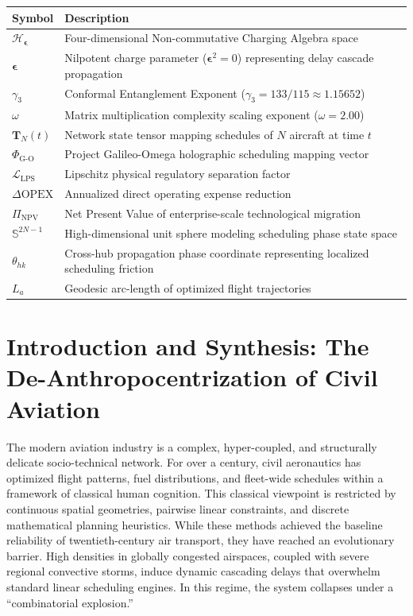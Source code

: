 \documentclass[11pt,a4paper]{book}
\begin{document}
\begin{tabular}{ll}
    \toprule
    \textbf{Symbol} & \textbf{Description} \\
    \midrule
    $\mathcal{H}_{\bm{\epsilon}}$ & Four-dimensional Non-commutative Charging Algebra space \\
    $\bm{\epsilon}$ & Nilpotent charge parameter ($\bm{\epsilon}^2 = 0$) representing delay cascade propagation \\
    $\gamma_3$ & Conformal Entanglement Exponent ($\gamma_3 = 133/115 \approx 1.15652$) \\
    $\omega$ & Matrix multiplication complexity scaling exponent ($\omega = 2.00$) \\
    $\mathbf{T}_N(t)$ & Network state tensor mapping schedules of $N$ aircraft at time $t$ \\
    $\Phi_{\text{G-O}}$ & Project Galileo-Omega holographic scheduling mapping vector \\
    $\mathcal{L}_{\text{LPS}}$ & Lipschitz physical regulatory separation factor \\
    $\Delta \text{OPEX}$ & Annualized direct operating expense reduction \\
    $\Pi_{\text{NPV}}$ & Net Present Value of enterprise-scale technological migration \\
    $\mathbb{S}^{2N-1}$ & High-dimensional unit sphere modeling scheduling phase state space \\
    $\theta_{hk}$ & Cross-hub propagation phase coordinate representing localized scheduling friction \\
    $L_a$ & Geodesic arc-length of optimized flight trajectories \\
    \bottomrule
\end{tabular}

\section{Introduction and Synthesis: The De-Anthropocentrization of Civil Aviation}\label{sec:ch10_intro}

The modern aviation industry is a complex, hyper-coupled, and structurally delicate socio-technical network. For over a century, civil aeronautics has optimized flight patterns, fuel distributions, and fleet-wide schedules within a framework of classical human cognition. This classical viewpoint is restricted by continuous spatial geometries, pairwise linear constraints, and discrete mathematical planning heuristics. While these methods achieved the baseline reliability of twentieth-century air transport, they have reached an evolutionary barrier. High densities in globally congested airspaces, coupled with severe regional convective storms, induce dynamic cascading delays that overwhelm standard linear scheduling engines. In this regime, the system collapses under a ``combinatorial explosion.''
\end{document}
